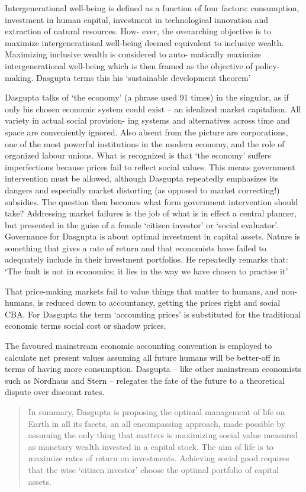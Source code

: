 \documentclass[
]{book}
\begin{document}
Intergenerational well-being is defined as a function of four factors: consumption, investment in
human capital, investment in technological innovation and extraction of natural resources. How-
ever, the overarching objective is to maximize intergenerational well-being deemed equivalent to
inclusive wealth.
Maximizing inclusive wealth is considered to auto-
matically maximize intergenerational well-being which is then framed as the objective of policy-
making. Dasgupta terms this his `sustainable development theorem'

Dasgupta talks of `the economy' (a phrase used 91 times) in the singular, as if only his chosen
economic system could exist -- an idealized market capitalism. All variety in actual social provision-
ing systems and alternatives across time and space are conveniently ignored. Also absent from the
picture are corporations, one of the most powerful institutions in the modern economy, and the role
of organized labour unions. What is recognized is that `the economy' suffers imperfections because
prices fail to reflect social values. This means government intervention must be allowed, although
Dasgupta repeatedly emphasizes its dangers and especially market distorting (as opposed to market
correcting!) subsidies. The question then becomes what form government intervention should take?
Addressing market failures is the job of what is in effect a central planner, but presented in the
guise of a female `citizen investor' or `social evaluator'.
Governance for Dasgupta is about optimal
investment in capital assets. Nature is something that gives a rate of return and that economists have
failed to adequately include in their investment portfolios.
He repeatedly remarks that: `The fault is
not in economics; it lies in the way we have chosen to practise it'

That price-making markets fail to value things that matter to humans, and non-humans, is
reduced down to accountancy, getting the prices right and social CBA.
For Dasgupta the term `accounting prices' is substituted for the traditional economic terms
social cost or shadow prices.

The favoured mainstream economic accounting convention is
employed to calculate net present values assuming all future humans will be better-off in terms
of having more consumption. Dasgupta -- like other mainstream economists such as Nordhaus
and Stern -- relegates the fate of the future to a theoretical dispute over discount
rates.

\begin{quote}
In summary, Dasgupta is proposing the optimal management of life on Earth in all its facets, an
all encompassing approach, made possible by assuming the only thing that matters is maximizing
social value measured as monetary wealth invested in a capital stock. The aim of life is to maximize
rates of return on investments. Achieving social good requires that the wise `citizen investor' choose
the optimal portfolio of capital assets.
\end{quote}
\end{document}
